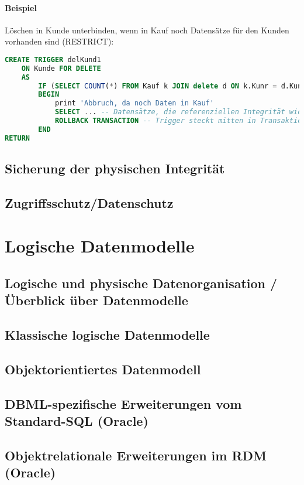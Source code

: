 \subsubsection*{Beispiel}
Löschen in Kunde unterbinden, wenn in Kauf noch Datensätze für den Kunden vorhanden sind (RESTRICT):
\begin{lstlisting}[language=SQL]
CREATE TRIGGER delKund1
	ON Kunde FOR DELETE
	AS
		IF (SELECT COUNT(*) FROM Kauf k JOIN delete d ON k.Kunr = d.Kunr) > 0
		BEGIN
			print 'Abbruch, da noch Daten in Kauf'
			SELECT ... -- Datensätze, die referenziellen Integrität widersprechen auch mit print ausgeben
			ROLLBACK TRANSACTION -- Trigger steckt mitten in Transaktion, deswegen kann hier ein Rollback der Transaktion veranlasst werden, obwohl sie hier nicht explizit begonnen wurde
		END
RETURN
\end{lstlisting}
\section{Sicherung der physischen Integrität}
\section{Zugriffsschutz/Datenschutz}

\chapter{Logische Datenmodelle}
\section{Logische und physische Datenorganisation / Überblick über Datenmodelle}
\section{Klassische logische Datenmodelle}
\section{Objektorientiertes Datenmodell}
\section{DBML-spezifische Erweiterungen vom Standard-SQL (Oracle)}
\section{Objektrelationale Erweiterungen im RDM (Oracle)}

